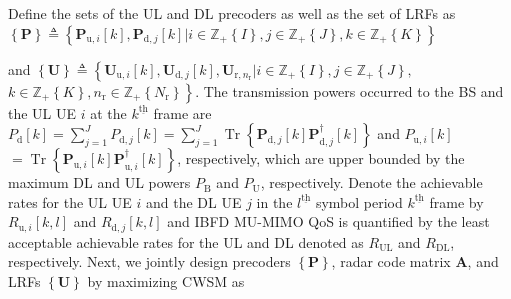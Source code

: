 \documentclass[10pt,journal]{IEEEtran}
\DeclareMathOperator{\trace}{Tr}
\newcommand{\bracket}[1]{{\left [{#1}\right ]}}
\newcommand{\braces}[1]{{\left\{ {#1}\right\}}}
\newcommand{\ith}[1]    {{#1}^{\underline{\text{th}}}}
\newcommand{\rr}{_\mathrm{r}}
\newcommand{\B}{\textrm{B}}
\newcommand{\rnr}{_{\mathrm{r},n_\mathrm{r}}}
\newcommand{\PiB}{\mathbf{P}_{\textrm{u},i}\bracket{k}}
\newcommand{\PiBH}{\mathbf{P}^\dagger_{\textrm{u},i}\bracket{k}}
\newcommand{\PBj}{\mathbf{P}_{\textrm{d},j}\bracket{k}}
\newcommand{\PBjH}{\mathbf{P}^\dagger_{\textrm{d},j}\bracket{k}}
\newcommand{\UiB}{\mathbf{U}_{\textrm{u},i}\bracket{k}}
\newcommand{\UBj}{\mathbf{U}_{\textrm{d},j}\bracket{k}}
\theoremstyle{definition}
\begin{document}
Define the sets of the UL and DL precoders as well as the set of LRFs as $\braces{\mathbf{P}}\triangleq\braces{\PiB,\PBj | i\in\mathbb{Z}_+\braces{I}, j\in\mathbb{Z}_+\braces{J}, k\in\mathbb{Z}_+\braces{K}}$

and
$\braces{\mathbf{U}}\triangleq\left\lbrace\UiB, \UBj, \mathbf{U}\rnr | i\in\mathbb{Z}_+\braces{I}, j\in\mathbb{Z}_+\braces{J},\right.$ $\left.k\in\mathbb{Z}_+\braces{K}, n\rr\in \mathbb{Z}_+\braces{N\rr}\right\rbrace$. 
The transmission powers occurred to the BS and the UL UE $i$ at the $\ith{k}$ frame are $P_{\mathrm{d}}\bracket{k}=\sum_{j=1}^{J}\mathit{P}_{\mathrm{d},j}\bracket{k}=\sum_{j=1}^{J}\trace\braces{\PBj\PBjH}$ and $\mathit{P}_{\mathrm{u},i}\bracket{k}$ $=\trace\braces{\PiB\PiBH}$, respectively, which are upper bounded by the maximum DL and UL powers $\mathit{P}_\B$ and $\mathit{P}_{\mathrm{U}}$, respectively. Denote the achievable rates for the UL UE $i$ and the DL UE $j$ in the $\ith{l}$ symbol period $\ith{k}$ frame by $R_{\mathrm{u},i}\bracket{k,l}$ and $R_{\mathrm{d},j}\bracket{k,l}$ and IBFD MU-MIMO QoS is quantified by the least acceptable achievable rates for the UL and DL denoted as $\mathit{R}_{\mathrm{UL}}$ and $\mathit{R}_{\mathrm{DL}}$, respectively. Next, we jointly design precoders $\braces{\mathbf{P}}$, radar code matrix $\mathbf{A}$, and LRFs $\braces{\mathbf{U}}$ by maximizing CWSM as \par\noindent\small
\end{document}
